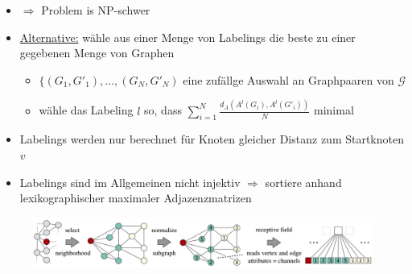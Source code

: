 \begin{itemize}
  \item $\Rightarrow$ Problem is NP-schwer
  \item \underline{Alternative:} wähle aus einer Menge von Labelings die beste zu einer gegebenen Menge von Graphen
  \begin{itemize}
    \item $\lbrace (G_1, G'_1), \ldots, (G_N, G'_N)$ eine zufällge Auswahl an Graphpaaren von $\mathcal{G}$
    \item wähle das Labeling $l$ so, dass $\sum_{i=1}^N \frac{d_A(A^l(G_i), A^l(G'_i))}{N}$ minimal
  \end{itemize}
  \item Labelings werden nur berechnet für Knoten gleicher Distanz zum Startknoten $v$
  \item Labelings sind im Allgemeinen nicht injektiv $\Rightarrow$ sortiere anhand lexikographischer maximaler Adjazenzmatrizen
\end{itemize}

\begin{figure}[h]
  \centering
  \includegraphics[width=.9\textwidth]{images/normalization}
\end{figure}
